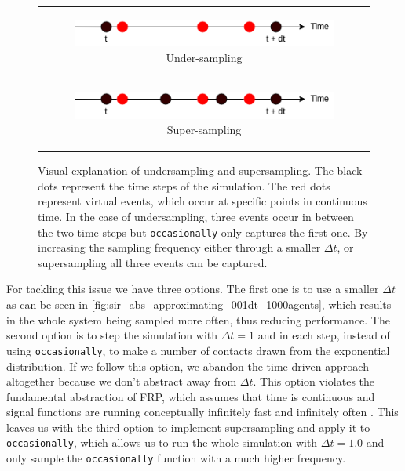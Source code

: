 \begin{figure}
\begin{center}
	\begin{tabular}{c}
		\begin{subfigure}[b]{0.5\textwidth}
			\centering
			\includegraphics[width=1\textwidth, angle=0]{./fig/timedriven/undersampling.png}
			\caption{Under-sampling}
			\label{fig:undersampling}
		\end{subfigure}
		
		\\
		
		\begin{subfigure}[b]{0.5\textwidth}
			\centering
			\includegraphics[width=1\textwidth, angle=0]{./fig/timedriven/supersampling.png}
			\caption{Super-sampling}
			\label{fig:supersampling}
		\end{subfigure}
	\end{tabular}
	
	\caption[Visual explanation of undersampling and supersampling]{Visual explanation of undersampling and supersampling. The black dots represent the time steps of the simulation. The red dots represent virtual events, which occur at specific points in continuous time. In the case of undersampling, three events occur in between the two time steps but \texttt{occasionally} only captures the first one. By increasing the sampling frequency either through a smaller $\Delta t$, or supersampling all three events can be captured.} 
	\label{fig:sampling_issue}
\end{center}
\end{figure}

For tackling this issue we have three options. The first one is to use a smaller $\Delta t$ as can be seen in \ref{fig:sir_abs_approximating_001dt_1000agents}, which results in the whole system being sampled more often, thus reducing performance. The second option is to step the simulation with $\Delta t = 1$ and in each step, instead of using \texttt{occasionally}, to make a number of contacts drawn from the exponential distribution. If we follow this option, we abandon the time-driven approach altogether because we don't abstract away from $\Delta t$. This option violates the fundamental abstraction of FRP, which assumes that time is continuous and signal functions are running conceptually infinitely fast and infinitely often \cite{winograd-cort_wormholes:_2012}. This leaves us with the third option to implement supersampling and apply it to \texttt{occasionally}, which allows us to run the whole simulation with $\Delta t = 1.0$ and only sample the \texttt{occasionally} function with a much higher frequency.

